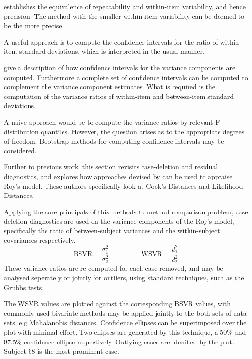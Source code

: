 \documentclass[12pt, a4paper]{report}
\theoremstyle{definition}
\theoremstyle{remark}
\begin{document}
\citet{ARoy2009} establishes the equivalence of repeatability and within-item variability, and hence precision.  The method with the smaller within-item variability can be deemed to be the more precise.

A useful approach is to compute the confidence intervals for the ratio of within-item standard deviations, which is interpreted in the usual manner.
%

\citet[pb 93-95]{PB} give a description of how confidence intervals for the variance components are computed. Furthermore a complete set of confidence intervals can be computed to complement the variance component estimates. What is required is the computation of the variance ratios of within-item and between-item standard deviations.

A naive approach would be to compute the variance ratios by relevant F distribution quantiles. However, the question arises as to the appropriate degrees of freedom. Bootstrap methods for computing confidence intervals may be considered.

Further to previous work, this section revisits case-deletion and residual diagnostics, and explores how approaches devised by \citet{Galecki} can be used to appraise Roy's model. These authors specifically look at Cook's Distances and Likelihood Distances.
%




Applying the core principals of this methods to method comparison problem, case deletion diagnostics are used on the variance components of the Roy's model, specifically the ratio of between-subject variances and the within-subject covariances respectively.
\[ \mbox{BSVR} = \frac{\sigma^2_1}{\sigma^2_2} \phantom{makespace}  \mbox{WSVR} = \frac{d^2_1}{d^2_2} \]
These variance ratios are re-computed for each case removed, and may be analysed seperately or jointly for outliers, using standard techniques, such as the Grubbs tests.


The WSVR values are plotted against the corresponding BSVR values, with commonly used bivariate methods may be applied jointly to the both sets of data sets, e.g Mahalanobis distances. Confidence ellipses can be superimposed over the plot with minimal effort. Two ellipses are generated by this technique, a 50\% and 97.5\% confidence ellipse respectively. Outlying cases are idenified by the plot. Subject 68 is the most prominent case.
\end{document}
